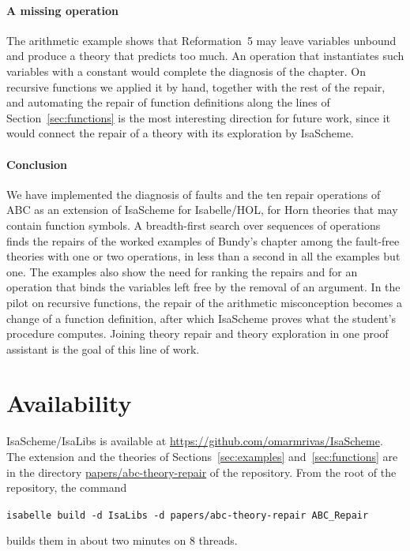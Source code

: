 \documentclass[preprint,12pt]{elsarticle}
\newcommand{\isa}[1]{\texttt{#1}}
\begin{document}
\paragraph{A missing operation}
The arithmetic example shows that Reformation~5 may leave variables
unbound and produce a theory that predicts too much. An operation that
instantiates such variables with a constant would complete the diagnosis of
the chapter. On recursive functions we applied it by hand, together with
the rest of the repair, and automating the repair of function definitions
along the lines of Section~\ref{sec:functions} is the most interesting
direction for future work, since it would connect the repair of a theory
with its exploration by IsaScheme.

\paragraph{Conclusion}
We have implemented the diagnosis of faults and the ten repair operations
of ABC as an extension of IsaScheme for Isabelle/HOL, for Horn theories
that may contain function symbols. A breadth-first search over sequences of
operations finds the repairs of the worked examples of Bundy's chapter
among the fault-free theories with one or two operations, in less than a
second in all the examples but one. The examples also show the need for
ranking the repairs and for an operation that binds the variables left
free by the removal of an argument. In the pilot on recursive functions,
the repair of the arithmetic misconception becomes a change of a function
definition, after which IsaScheme proves what the student's procedure
computes. Joining theory repair and theory exploration in one proof
assistant is the goal of this line of work.

\section*{Availability}
{\sloppy
IsaScheme/IsaLibs is available at
\url{https://github.com/omarmrivas/IsaScheme}. The extension and the
theories of Sections~\ref{sec:examples} and~\ref{sec:functions} are in the
directory \url{papers/abc-theory-repair} of the repository. From the
root of the repository, the command
\begin{center}
\isa{isabelle build -d IsaLibs -d papers/abc-theory-repair ABC\_Repair}
\end{center}
builds them in about two minutes on 8 threads.\par}



\end{document}
